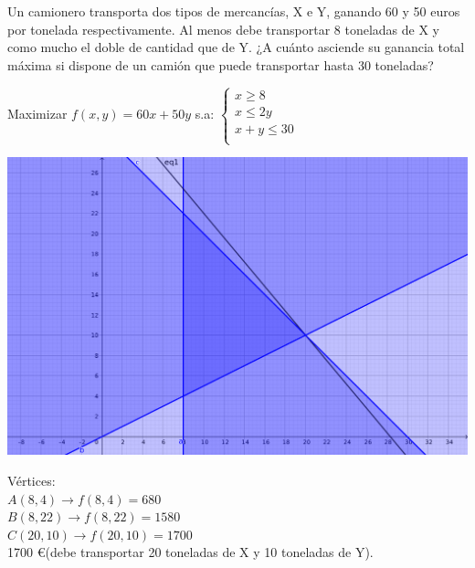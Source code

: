 \documentclass[addpoints,spanish, 12pt,a4paper]{exam}
\begin{document}
\begin{questions}
\begin{parts}
\end{parts}

\addpoints






\question[2] Un camionero transporta dos tipos de mercancías, X e Y, ganando 60 y 50 euros por
tonelada respectivamente. Al menos debe transportar 8 toneladas de X y como mucho el doble de cantidad
que de Y. ¿A cuánto asciende su ganancia total máxima si dispone de un camión que puede transportar
hasta 30 toneladas? 


  
\begin{solution}
Maximizar $f(x,y)=60x+50y$ s.a: $\left\{ \begin{matrix}
x \geqslant 8 \\
x \leqslant 2y \\
x+y \leqslant 30 \\
 \end{matrix} \right.$ 
 
\includegraphics[scale=0.2]{sep2007}


Vértices:\\
$A(8 , 4) \to f(8,4)=680$\\
$B(8 , 22) \to f(8,22)=1580$\\
$C(20 , 10) \to f(20,10)=1700$\\

1700 \euro (debe transportar 20 toneladas de X y 10 toneladas de Y). \end{solution}




\addpoints



\end{questions}
\end{document}
